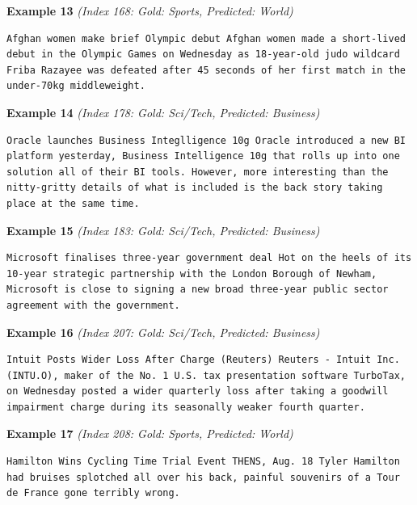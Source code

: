 \noindent
\textbf{Example 13} \quad \textit{(Index 168: Gold: Sports, Predicted: World)}

\begin{Verbatim}[breaklines=true,breakanywhere=true,fontsize=\small]
Afghan women make brief Olympic debut Afghan women made a short-lived debut in the Olympic Games on Wednesday as 18-year-old judo wildcard Friba Razayee was defeated after 45 seconds of her first match in the under-70kg middleweight.
\end{Verbatim}

\noindent
\textbf{Example 14} \quad \textit{(Index 178: Gold: Sci/Tech, Predicted: Business)}

\begin{Verbatim}[breaklines=true,breakanywhere=true,fontsize=\small]
Oracle launches Business Integlligence 10g Oracle introduced a new BI platform yesterday, Business Intelligence 10g that rolls up into one solution all of their BI tools. However, more interesting than the nitty-gritty details of what is included is the back story taking place at the same time.
\end{Verbatim}

\noindent
\textbf{Example 15} \quad \textit{(Index 183: Gold: Sci/Tech, Predicted: Business)}

\begin{Verbatim}[breaklines=true,breakanywhere=true,fontsize=\small]
Microsoft finalises three-year government deal Hot on the heels of its 10-year strategic partnership with the London Borough of Newham, Microsoft is close to signing a new broad three-year public sector agreement with the government.
\end{Verbatim}

\noindent
\textbf{Example 16} \quad \textit{(Index 207: Gold: Sci/Tech, Predicted: Business)}

\begin{Verbatim}[breaklines=true,breakanywhere=true,fontsize=\small]
Intuit Posts Wider Loss After Charge (Reuters) Reuters - Intuit Inc. (INTU.O), maker of the No. 1 U.S. tax presentation software TurboTax, on Wednesday posted a wider quarterly loss after taking a goodwill impairment charge during its seasonally weaker fourth quarter.
\end{Verbatim}

\noindent
\textbf{Example 17} \quad \textit{(Index 208: Gold: Sports, Predicted: World)}

\begin{Verbatim}[breaklines=true,breakanywhere=true,fontsize=\small]
Hamilton Wins Cycling Time Trial Event THENS, Aug. 18 Tyler Hamilton had bruises splotched all over his back, painful souvenirs of a Tour de France gone terribly wrong.
\end{Verbatim}

